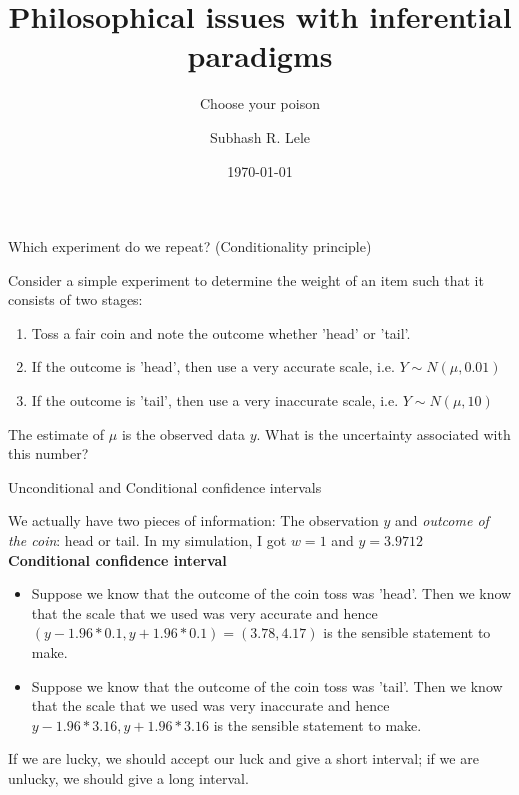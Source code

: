 \documentclass[10pt]{beamer}
\title{Philosophical issues with inferential paradigms}
\subtitle {Choose your poison}
\author{Subhash R. Lele}
\institute {University of Alberta}
\institute{Department of Mathematical Sciences\\University of Alberta\\Canada\\\textit{Email: slele@ualberta.ca}}
\date{\today}
\begin{document}
\frame{\titlepage}



\begin{frame}
\begin{center}
\LARGE {Which experiment do we repeat? (Conditionality principle)}
\end{center}

Consider a simple experiment to determine the weight of an item such that it consists of two stages:
\pause
\begin{enumerate}
\item Toss a fair coin and note the outcome whether 'head' or 'tail'.
\pause
\item If the outcome is 'head', then use a very accurate scale, i.e. $Y \sim N(\mu,0.01)$
\pause
\item If the outcome is 'tail', then use a very \alert{in}accurate scale, i.e. $Y \sim N(\mu,10)$
\end{enumerate}
\pause
 The estimate of $\mu$ is the observed data $y$. What is the uncertainty associated with this number?
\end{frame}

\begin{frame}
\begin{center}
\LARGE Unconditional and Conditional confidence intervals
\end{center}

We actually have two pieces of information: The observation $y$ and \emph{outcome of the coin}: head or tail.
In my simulation, I got $w=1$ and $y=3.9712$\\
\textbf {Conditional confidence interval}
\begin{itemize}
\item 
Suppose we know that the outcome of the coin toss was 'head'. Then we know that the scale that we used was very accurate and hence $(y-1.96*0.1,y+1.96*0.1)=(3.78,4.17)$ is the sensible statement to make.
\pause
\item 
Suppose we know that the outcome of the coin toss was 'tail'. Then we know that the scale that we used was very inaccurate and hence $y-1.96*3.16,y+1.96*3.16$ is the sensible statement to make.
\end{itemize}
\pause
If we are lucky, we should accept our luck and give a short interval; if we are unlucky, we should give a long interval. 
\end{frame}
\end{document}
